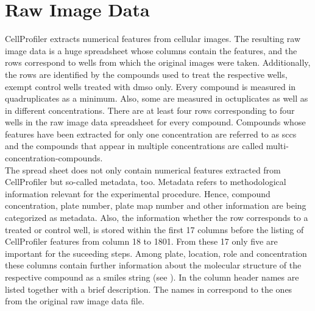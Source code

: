 \section{Raw Image Data}\label{sec:rid}
CellProfiler extracts numerical features from cellular images. The resulting raw image data is a huge spreadsheet whose columns contain the features, and the rows correspond to wells from which the original images were taken. Additionally, the rows are identified by the compounds used to treat the respective wells, exempt control wells treated with \ac{dmso} only. Every compound is measured in quadruplicates as a minimum. Also, some are measured in octuplicates as well as in different concentrations. There are at least four rows corresponding to four wells in the raw image data spreadsheet for every compound. Compounds whose features have been extracted for only one concentration are referred to as \acl{scc}s and the compounds that appear in multiple concentrations are called multi-concentration-compounds.\\
The spread sheet does not only contain numerical features extracted from CellProfiler but so-called metadata, too. Metadata refers to methodological information relevant for the experimental procedure. Hence, compound concentration, plate number, plate map number and other information are being categorized as metadata. Also, the information whether the row corresponds to a treated or control well, is stored within the first \num{17} columns before the listing of CellProfiler features from column \num{18} to \num{1801}. From these 17 only five are important for the suceeding steps. Among plate, location, role and concentration these columns contain further information about the molecular structure of the respective compound as a \ac{smiles} string (see ). In  the column header names are listed together with a brief description. The names in  correspond to the ones from the original raw image data file.\cite{Bray2017}

